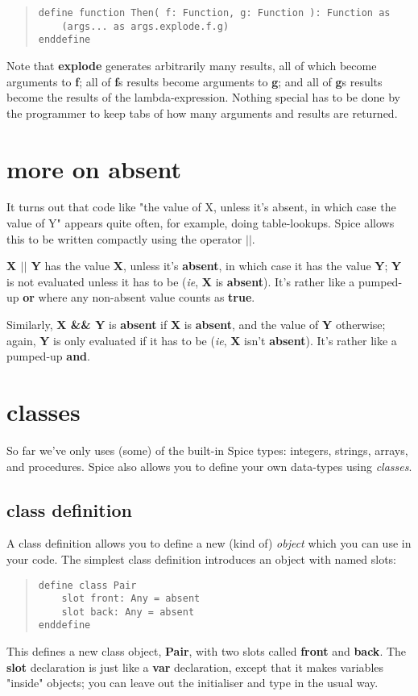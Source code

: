 \documentclass{report}
\begin{document}
\begin{quote}
\begin{verbatim}
define function Then( f: Function, g: Function ): Function as
    (args... as args.explode.f.g)
enddefine
\end{verbatim}
\end{quote}
Note that {\bf explode} generates arbitrarily many results, all of which become
arguments to {\bf f}; all of {\bf f}s results become arguments to {\bf g}; and all
of {\bf g}s results become the results of the lambda-expression. Nothing
special has to be done by the programmer to keep tabs of how many arguments
and results are returned.\chapter{more on {\bf absent}}


It turns out that code like "the value of X, unless it's absent, in which case
the value of Y" appears quite often, for example, doing table-lookups. Spice
allows this to be written compactly using the operator {\bf $\mid$$\mid$}.

{\bf X $\mid$$\mid$ Y} has the value {\bf X}, unless it's {\bf absent}, in which case it has the
value {\bf Y}; {\bf Y} is not evaluated unless it has to be ({\em ie}, {\bf X} is {\bf absent}).
It's rather like a pumped-up {\bf or} where any non-absent value counts as {\bf true}.

Similarly, {\bf X \&\& Y} is {\bf absent} if {\bf X} is {\bf absent}, and the value of {\bf Y}
otherwise; again, {\bf Y} is only evaluated if it has to be ({\em ie}, {\bf X} isn't
{\bf absent}). It's rather like a pumped-up {\bf and}.\chapter{classes}


So far we've only uses (some) of the built-in Spice types: integers, strings,
arrays, and procedures. Spice also allows you to define your own data-types
using {\em classes}.

\section{class definition}


A class definition allows you to define a new (kind of) {\em object} which you
can use in your code. The simplest class definition introduces an object
with named slots:

\begin{quote}
\begin{verbatim}
define class Pair
    slot front: Any = absent
    slot back: Any = absent
enddefine
\end{verbatim}
\end{quote}
This defines a new class object, {\bf Pair}, with two slots called {\bf front} and
{\bf back}. The {\bf slot} declaration is just like a {\bf var} declaration, except that
it makes variables "inside" objects; you can leave out the initialiser and
type in the usual way.
\end{document}
